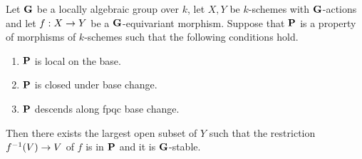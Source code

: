 \begin{theorem}\label{theorem:base_locus_of_certain_classes_of_morphisms_are_stable_under_locally_algebraic_group_action}
Let $\mathbf{G}$ be a locally algebraic group over $k$, let $X,Y$ be $k$-schemes with $\mathbf{G}$-actions and let $f:X\rightarrow Y$ be a $\mathbf{G}$-equivariant morphism. Suppose that $\mathbf{P}$ is a property of morphisms of $k$-schemes such that the following conditions hold.
\begin{enumerate}[label=\emph{\textbf{(\arabic*)}}, leftmargin=3.0em]
\item $\mathbf{P}$ is local on the base.
\item $\mathbf{P}$ is closed under base change.
\item $\mathbf{P}$ descends along fpqc base change.
\end{enumerate}
Then there exists the largest open subset of $Y$ such that the restriction $f^{-1}(V)\rightarrow V$ of $f$ is in $\mathbf{P}$ and it is $\mathbf{G}$-stable.
\end{theorem}
